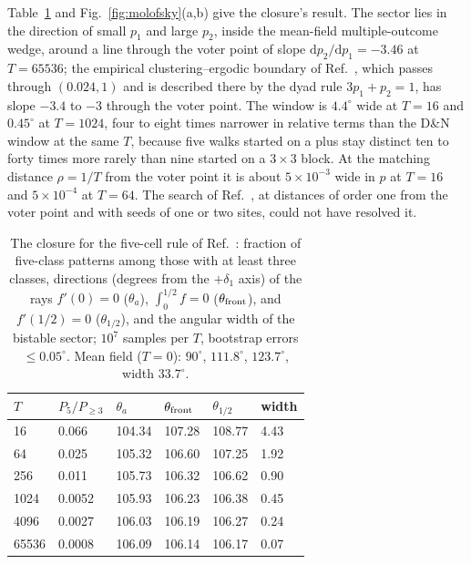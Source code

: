 \documentclass[pre,twocolumn,superscriptaddress,showpacs,floatfix]{revtex4-2}
\newcommand{\ds}{\mathrm{d}}
\begin{document}
Table~\ref{tab:molofsky} and Fig.~\ref{fig:molofsky}(a,b) give the closure's result. The sector
lies in the direction of small $p_1$ and large $p_2$, inside the mean-field multiple-outcome
wedge, around a line through the voter point of slope $\ds p_2/\ds p_1 = -3.46$ at $T = 65536$;
the empirical clustering--ergodic boundary of Ref.~\cite{molofsky1999}, which passes through
$(0.024, 1)$ and is described there by the dyad rule $3p_1 + p_2 = 1$, has slope $-3.4$ to $-3$
through the voter point. The window is $4.4^\circ$ wide at $T = 16$ and $0.45^\circ$ at
$T = 1024$, four to eight times narrower in relative terms than the D\&N window at the same $T$,
because five walks started on a plus stay distinct ten to forty times more rarely than nine
started on a $3\times3$ block. At the matching distance $\rho = 1/T$ from the voter point it is
about $5\times10^{-3}$ wide in $p$ at $T = 16$ and $5\times10^{-4}$ at $T = 64$. The search of
Ref.~\cite{molofsky1999}, at distances of order one from the voter point and with seeds of one
or two sites, could not have resolved it.

\begin{table}
\caption{The closure for the five-cell rule of Ref.~\cite{molofsky1999}: fraction of five-class
patterns among those with at least three classes, directions (degrees from the $+\delta_1$ axis)
of the rays $f'(0) = 0$ ($\theta_a$), $\int_0^{1/2} f = 0$ ($\theta_{\rm front}$), and
$f'(1/2) = 0$ ($\theta_{1/2}$), and the angular width of the bistable sector; $10^7$ samples per
$T$, bootstrap errors $\le 0.05^\circ$. Mean field ($T = 0$): $90^\circ$, $111.8^\circ$,
$123.7^\circ$, width $33.7^\circ$.}
\label{tab:molofsky}
\begin{ruledtabular}
\begin{tabular}{llllll}
$T$ & $P_5/P_{\ge3}$ & $\theta_a$ & $\theta_{\rm front}$ & $\theta_{1/2}$ & width \\
\hline
16 & 0.066 & 104.34 & 107.28 & 108.77 & 4.43 \\
64 & 0.025 & 105.32 & 106.60 & 107.25 & 1.92 \\
256 & 0.011 & 105.73 & 106.32 & 106.62 & 0.90 \\
1024 & 0.0052 & 105.93 & 106.23 & 106.38 & 0.45 \\
4096 & 0.0027 & 106.03 & 106.19 & 106.27 & 0.24 \\
65536 & 0.0008 & 106.09 & 106.14 & 106.17 & 0.07 \\
\end{tabular}
\end{ruledtabular}
\end{table}
\end{document}
